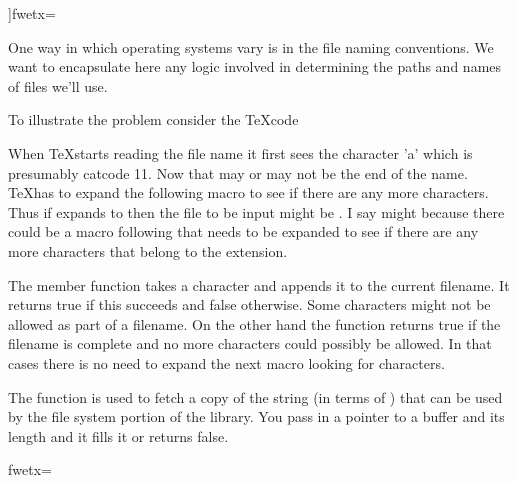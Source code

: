]fwetx=%
\fwcdef 
\fwbeginmacronotes
{}
\fwendmacronotes
\fwendmacro




One way in which operating systems vary is in the file naming
conventions. We want to encapsulate here any logic involved
in determining the paths and names of files we'll use.

To illustrate the problem consider the \TeX code 


When \TeX starts reading the file name it first sees the character 'a'
which is presumably catcode 11. Now that may or may not be the end of
the name. \TeX has to expand the following macro  to see if
there are any more characters. Thus if  expands to 
then the file to be input might be . I say might because
there could be a macro following  that needs to be expanded
to see if there are any more characters that belong to the extension.

The member function  takes a character and appends it to the
current filename. It returns true if this succeeds and false
otherwise.  Some characters might not be allowed as part of a
filename. On the other hand the function  returns true if
the filename is complete and no more characters could possibly be
allowed. In that cases there is no need to expand the next macro
looking for characters.

The function  is used to fetch a copy of the string
(in terms of ) that can be used by the file system portion of
the library. You pass in a pointer to a buffer and its length
and it fills it or returns false.

\fwbeginmacro
{}\fwequals \fwodef {}fwetx=%
\fwcdef 
\fwbeginmacronotes
{}
\fwendmacronotes
\fwendmacro



